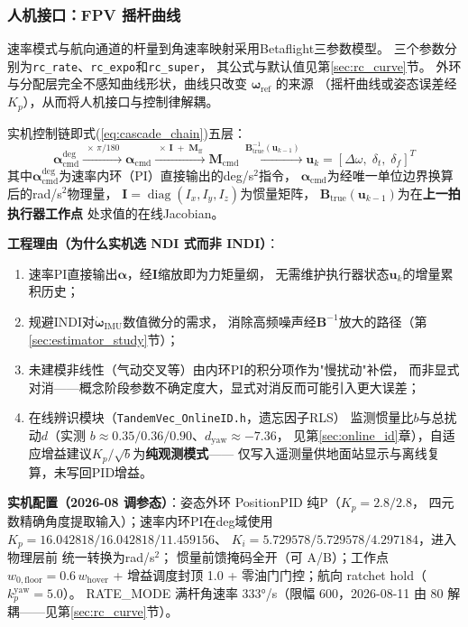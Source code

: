 \subsubsection{人机接口：FPV 摇杆曲线}

速率模式与航向通道的杆量到角速率映射采用Betaflight三参数模型。
三个参数分别为\texttt{rc\_rate}、\texttt{rc\_expo}和\texttt{rc\_super}，
其公式与默认值见第\ref{sec:rc_curve}节。
外环与分配层完全不感知曲线形状，曲线只改变 $\boldsymbol{\omega}_{\mathrm{ref}}$ 的来源
（摇杆曲线或姿态误差经$K_p$），从而将人机接口与控制律解耦。

\begin{remark}
\label{rem:firmware_alloc}
实机控制链即式(\ref{eq:cascade_chain})五层：
\begin{equation}
    \boldsymbol{\alpha}_{\mathrm{cmd}}^{\deg}
    \xrightarrow{\;\times\,\pi/180\;}
    \boldsymbol{\alpha}_{\mathrm{cmd}}
    \xrightarrow{\;\times\,\mathbf{I}\;+\;\mathbf{M}_{\mathrm{ff}}\;}
    \mathbf{M}_{\mathrm{cmd}} \xrightarrow{\;\mathbf{B}_{\mathrm{true}}^{-1}(\mathbf{u}_{k-1})\;}
    \mathbf{u}_k = [\Delta\omega,\;\delta_t,\;\delta_f]^T
    \label{eq:cascade_alloc_firmware2}
\end{equation}
其中$\boldsymbol{\alpha}_{\mathrm{cmd}}^{\deg}$为速率内环（PI）直接输出的deg/s$^2$指令，
$\boldsymbol{\alpha}_{\mathrm{cmd}}$为经唯一单位边界换算后的rad/s$^2$物理量，
$\mathbf{I}=\operatorname{diag}(I_x,I_y,I_z)$为惯量矩阵，
$\mathbf{B}_{\mathrm{true}}(\mathbf{u}_{k-1})$为在\textbf{上一拍执行器工作点}
处求值的在线Jacobian。

\textbf{工程理由（为什么实机选 NDI 式而非 INDI）}：
\begin{enumerate}[label=(\arabic*)]
    \item 速率PI直接输出$\boldsymbol{\alpha}$，经$\mathbf{I}$缩放即为力矩量纲，
          无需维护执行器状态$\mathbf{u}_k$的增量累积历史；
    \item 规避INDI对$\dot{\boldsymbol{\omega}}_{\mathrm{IMU}}$数值微分的需求，
          消除高频噪声经$\mathbf{B}^{-1}$放大的路径（第\ref{sec:estimator_study}节）；
    \item 未建模非线性（气动交叉等）由内环PI的积分项作为"慢扰动"补偿，
          而非显式对消——概念阶段参数不确定度大，显式对消反而可能引入更大误差；
    \item 在线辨识模块（\texttt{TandemVec\_OnlineID.h}，遗忘因子RLS）
          监测惯量比$b$与总扰动$d$（实测 $b\approx0.35/0.36/0.90$、$d_{\mathrm{yaw}}\approx-7.36$，
          见第\ref{sec:online_id}章），自适应增益建议$K_p/\sqrt{b}$为\textbf{纯观测模式}——
          仅写入遥测量供地面站显示与离线复算，未写回PID增益。
\end{enumerate}

\textbf{实机配置（2026-08 调参态）}：姿态外环 PositionPID 纯P（$K_p=2.8/2.8$，
四元数精确角度提取输入）；速率内环PI在deg域使用
$K_p=16.042818/16.042818/11.459156$、
$K_i=5.729578/5.729578/4.297184$，进入物理层前
统一转换为rad/s$^2$；
惯量前馈掩码全开（可 A/B）；工作点 $w_{0,\mathrm{floor}}=0.6\,w_{\mathrm{hover}}$
+ 增益调度封顶 1.0 + 零油门门控；航向 ratchet hold（$k_p^{\mathrm{yaw}}=5.0$）。
RATE\_MODE 满杆角速率 333°/s（限幅 600，2026-08-11 由 80 解耦——见第\ref{sec:rc_curve}节）。
\end{remark}
